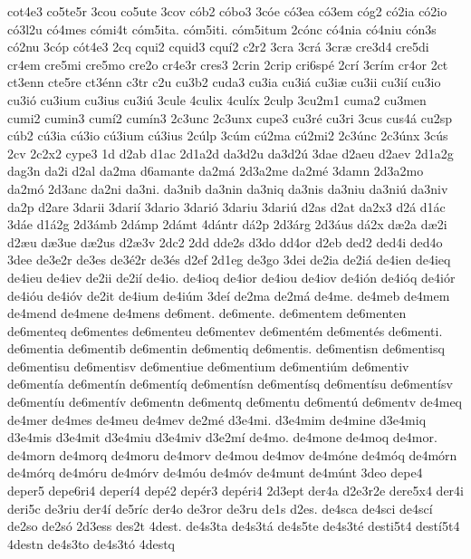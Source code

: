 {cot4e3
co5te5r
3cou
co5ute
3cov
c^^f3b2
c^^f3bo3
3c^^f3e
c^^f33ea
c^^f33em
c^^f3g2
c^^f32ia
c^^f32io
c^^f33l2u
c^^f34mes
c^^f3mi4t
c^^f3m5ita.
c^^f3m5iti.
c^^f3m5itum
2c^^f3nc
c^^f34nia
c^^f34niu
c^^f3n3s
c^^f32nu
3c^^f3p
c^^f3t4e3
2cq
cqui2
cquid3
cqu^^ed2
c2r2
3cra
3cr^^e1
3cr^^e6
cre3d4
cre5di
cr4em
cre5mi
cre5mo
cre2o
cr4e3r
cres3
2crin
2crip
cri6sp^^e9
2cr^^ed
3cr^^edm
cr4or
2ct
ct3enn
cte5re
ct3^^e9nn
c3tr
c2u
cu3b2
cuda3
cu3ia
cu3i^^e1
cu3i^^e6
cu3ii
cu3i^^ed
cu3io
cu3i^^f3
cu3ium
cu3ius
cu3i^^fa
3cule
4culix
4cul^^edx
2culp
3cu2m1
cuma2
cu3men
cumi2
cumin3
cum^^ed2
cum^^edn3
2c3unc
2c3unx
cupe3
cu3r^^e9
cu3ri
3cus
cus4^^e1
cu2sp
c^^fab2
c^^fa3ia
c^^fa3io
c^^fa3ium
c^^fa3ius
2c^^falp
3c^^fam
c^^fa2ma
c^^fa2mi2
2c3^^fanc
2c3^^fanx
3c^^fas
2cv
2c2x2
cype3
1d
d2ab
d1ac
2d1a2d
da3d2u
da3d2^^fa
3dae
d2aeu
d2aev
2d1a2g
dag3n
da2i
d2al
da2ma
d6amante
da2m^^e1
2d3a2me
da2m^^e9
3damn
2d3a2mo
da2m^^f3
2d3anc
da2ni
da3ni.
da3nib
da3nin
da3niq
da3nis
da3niu
da3ni^^fa
da3niv
da2p
d2are
3darii
3dari^^ed
3dario
3dari^^f3
3dariu
3dari^^fa
d2as
d2at
da2x3
d2^^e1
d1^^e1c
3d^^e1e
d1^^e12g
2d3^^e1mb
2d^^e1mp
2d^^e1mt
4d^^e1ntr
d^^e12p
2d3^^e1rg
2d3^^e1us
d^^e12x
d^^e62a
d^^e62i
d2^^e6u
d^^e63ue
d^^e62us
d2^^e63v
2dc2
2dd
dde2s
d3do
dd4or
d2eb
ded2
ded4i
ded4o
3dee
de3e2r
de3es
de3^^e92r
de3^^e9s
d2ef
2d1eg
de3go
3dei
de2ia
de2i^^e1
de4ien
de4ieq
de4ieu
de4iev
de2ii
de2i^^ed
de4io.
de4ioq
de4ior
de4iou
de4iov
de4i^^f3n
de4i^^f3q
de4i^^f3r
de4i^^f3u
de4i^^f3v
de2it
de4ium
de4i^^fam
3de^^ed
de2ma
de2m^^e1
de4me.
de4meb
de4mem
de4mend
de4mene
de4mens
de6ment.
de6mente.
de6mentem
de6menten
de6menteq
de6mentes
de6menteu
de6mentev
de6ment^^e9m
de6ment^^e9s
de6menti.
de6mentia
de6mentib
de6mentin
de6mentiq
de6mentis.
de6mentisn
de6mentisq
de6mentisu
de6mentisv
de6mentiue
de6mentium
de6menti^^fam
de6mentiv
de6ment^^eda
de6ment^^edn
de6ment^^edq
de6ment^^edsn
de6ment^^edsq
de6ment^^edsu
de6ment^^edsv
de6ment^^edu
de6ment^^edv
de6mentn
de6mentq
de6mentu
de6ment^^fa
de6mentv
de4meq
de4mer
de4mes
de4meu
de4mev
de2m^^e9
d3e4mi.
d3e4mim
de4mine
d3e4miq
d3e4mis
d3e4mit
d3e4miu
d3e4miv
d3e2m^^ed
de4mo.
de4mone
de4moq
de4mor.
de4morn
de4morq
de4moru
de4morv
de4mou
de4mov
de4m^^f3ne
de4m^^f3q
de4m^^f3rn
de4m^^f3rq
de4m^^f3ru
de4m^^f3rv
de4m^^f3u
de4m^^f3v
de4munt
de4m^^fant
3deo
depe4
deper5
depe6ri4
deper^^ed4
dep^^e92
dep^^e9r3
dep^^e9ri4
2d3ept
der4a
d2e3r2e
dere5x4
der4i
deri5c
de3riu
der4^^ed
de5r^^edc
der4o
de3ror
de3ru
de1s
d2es.
de4sca
de4sci
de4sc^^ed
de2so
de2s^^f3
2d3ess
des2t
4dest.
de4s3ta
de4s3t^^e1
de4s5te
de4s3t^^e9
desti5t4
dest^^ed5t4
4destn
de4s3to
de4s3t^^f3
4destq
}

